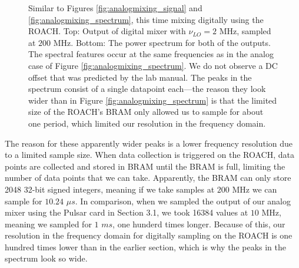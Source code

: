 \documentclass[12pt]{article}
\begin{document}
\begin{figure}[H]
\caption[SODUMB]{Similar to Figures \ref{fig:analogmixing_signal} and \ref{fig:analogmixing_spectrum}, this time mixing digitally using the ROACH. Top: Output of digital mixer with $\nu_{LO}=2$ MHz, sampled at $200$ MHz.  Bottom: The power spectrum for both of the outputs. The spectral features occur at the same frequencies as in the analog case of Figure \ref{fig:analogmixing_spectrum}.  We do not observe a DC offset that was predicted by the lab manual. The peaks in the spectrum consist of a single datapoint each---the reason they look wider than in Figure \ref{fig:analogmixing_spectrum} is that the limited size of the ROACH's BRAM only allowed us to sample for about one period, which limited our resolution in the frequency domain.}
\label{fig:digitalmixing}
\end{figure}

The reason for these apparently wider peaks is a lower frequency resolution due to a limited sample size. When data collection is triggered on the ROACH, data points are collected and stored in BRAM until the BRAM is full, limiting the number of data points that we can take. Apparently, the BRAM can only store 2048 32-bit signed integers, meaning if we take samples at $200$ MHz we can sample for $10.24$ $\mu s$. In comparison, when we sampled the output of our analog mixer using the Pulsar card in Section 3.1, we took 16384 values at $10$ MHz, meaning we sampled for $1$ $ms$, one hunderd times longer. Because of this, our resolution in the frequency domain for digitally sampling on the ROACH is one hundred times lower than in the earlier section, which is why the peaks in the spectrum look so wide.
\end{document}
